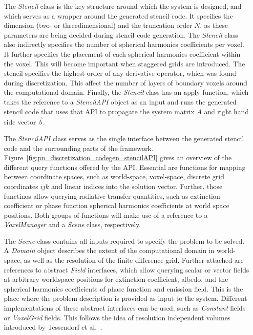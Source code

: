 The \emph{Stencil} class is the key structure around which the system is designed, and which serves as a wrapper around the generated stencil code. It specifies the dimension (two- or threedimensional) and the truncation order $N$, as these parameters are being decided during stencil code generation. The \emph{Stencil} class also indirectly specifies the number of spherical harmonics coefficients per voxel. It further specifies the placement of each spherical harmonics coefficient within the voxel. This will become important when staggered grids are introduced. The stencil specifies the highest order of any derivative operator, which was found during discretization. This affect the number of layers of boundary voxels around the computational domain. Finally, the \emph{Stencil} class has an apply function, which takes the reference to a \emph{StencilAPI} object as an input and runs the generated stencil code that uses that API to propagate the system matrix $A$ and right hand side vector $\vec{b}$.

The \emph{StencilAPI} class serves as the single interface between the generated stencil code and the surrounding parts of the framework. Figure~\ref{fig:pn_discretization_codegen_stencilAPI} gives an overview of the different query functions offered by the API. Essential are functions for mapping between coordinate spaces, such as world-space, voxel-space, discrete grid coordinates $ijk$ and linear indices into the solution vector. Further, those functinos allow querying radiative transfer quantities, such as extinction coefficient or phase function spherical harmonics coefficients at world space positions. Both groups of functions will make use of a reference to a \emph{VoxelManager} and a \emph{Scene} class, respectively.

The \emph{Scene} class contains all inputs required to specify the problem to be solved. A \emph{Domain} object describes the extent of the computational domain in world-space, as well as the resolution of the finite difference grid. Further attached are references to abstract \emph{Field} interfaces, which allow querying scalar or vector fields at arbitrary worldspace positions for extinction coefficient, albedo, and the spherical harmonics coefficients of phase function and emission field. This is the place where the problem description is provided as input to the system. Different implementations of these abstract interfaces can be used, such as \emph{Constant} fields or \emph{VoxelGrid} fields. This follows the idea of resolution independent volumes introduced by Tessendorf et al.~\cite{Tessendorf11}.

